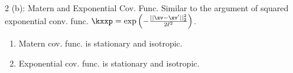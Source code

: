 \documentclass[aspectratio=169]{beamer}
\newcommand{\xvp}{\xv^\prime}
\begin{document}
\begin{frame}{2 (b): Matern and Exponential Cov. Func.}
	Similar to the argument of squared exponential conv. func. $\kxxp = \exp\left( - \frac{||\xv - \xvp||_2^2}{2 \ell^2}\right)$.
	\begin{enumerate}
		\item Matern cov. func. is stationary and isotropic.
		\item Exponential cov. func. is stationary and isotropic.
	\end{enumerate}
\end{frame}
\end{document}
